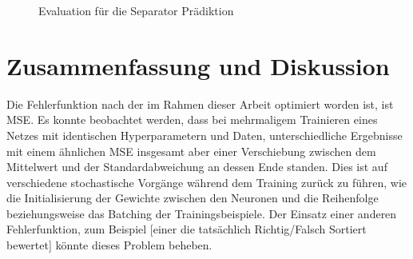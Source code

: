 \begin{figure}[h]
    \centering
	\caption{Evaluation für die Separator Prädiktion}
	\label{fig:boxplotErrorNNSeparator}
\end{figure}


\section{Zusammenfassung und Diskussion}


Die Fehlerfunktion nach der im Rahmen dieser Arbeit optimiert worden ist, ist MSE.
Es konnte beobachtet werden, dass bei mehrmaligem Trainieren eines Netzes 
mit identischen Hyperparametern und Daten, unterschiedliche Ergebnisse mit einem ähnlichen MSE insgesamt aber einer Verschiebung zwischen dem Mittelwert und der Standardabweichung  
an dessen Ende standen.
Dies ist auf verschiedene stochastische Vorgänge während dem Training zurück zu führen, wie die Initialisierung der Gewichte zwischen den Neuronen und die Reihenfolge beziehungsweise das Batching der Trainingsbeispiele.
Der Einsatz einer anderen Fehlerfunktion, zum Beispiel [einer die tatsächlich Richtig/Falsch Sortiert bewertet] könnte dieses Problem beheben.
